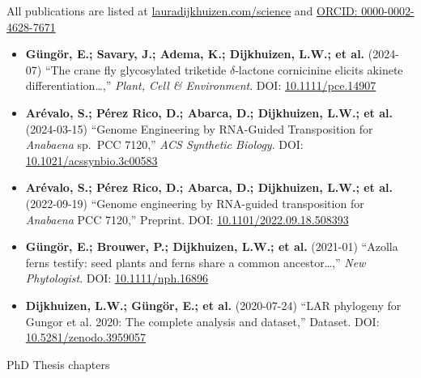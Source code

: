 \documentclass[a4paper,10pt]{article}
\begin{document}
\newpage


All publications are listed at \href{https://lauradijkhuizen.com/science}{lauradijkhuizen.com/science}  and 
\textcolor[HTML]{A6CE39}{\faOrcid}\href{https://orcid.org/0000-0002-4628-7671}{ORCID: 0000-0002-4628-7671}

\begin{itemize}
  \raggedright
  \item \textbf{Güngör, E.; Savary, J.; Adema, K.; Dijkhuizen, L.W.; et al.} (2024-07)  
    “The crane fly glycosylated triketide $\delta$‐lactone cornicinine elicits akinete differentiation…,”  
    \emph{Plant, Cell \& Environment}. DOI: \href{https://doi.org/10.1111/pce.14907}{10.1111/pce.14907}

  \item \textbf{Arévalo, S.; Pérez Rico, D.; Abarca, D.; Dijkhuizen, L.W.; et al.} (2024-03-15)  
    “Genome Engineering by RNA-Guided Transposition for \textit{Anabaena} sp.\ PCC 7120,”  
    \emph{ACS Synthetic Biology}. DOI: \href{https://doi.org/10.1021/acssynbio.3c00583}{10.1021/acssynbio.3c00583}

  \item \textbf{Arévalo, S.; Pérez Rico, D.; Abarca, D.; Dijkhuizen, L.W.; et al.} (2022-09-19)  
    “Genome engineering by RNA-guided transposition for \textit{Anabaena} PCC 7120,” Preprint.  
    DOI: \href{https://doi.org/10.1101/2022.09.18.508393}{10.1101/2022.09.18.508393}

  \item \textbf{Güngör, E.; Brouwer, P.; Dijkhuizen, L.W.; et al.} (2021-01)  
    “Azolla ferns testify: seed plants and ferns share a common ancestor…,”  
    \emph{New Phytologist}. DOI: \href{https://doi.org/10.1111/nph.16896}{10.1111/nph.16896}

  \item \textbf{Dijkhuizen, L.W.; Güngör, E.; et al.} (2020-07-24)  
    “LAR phylogeny for Gungor et al. 2020: The complete analysis and dataset,” Dataset.  
    DOI: \href{https://doi.org/10.5281/zenodo.3959057}{10.5281/zenodo.3959057}

\end{itemize}

\noindent
PhD Thesis chapters
\end{document}
